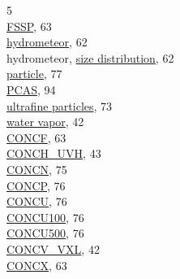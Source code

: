 \documentclass[
  english,
]{book}
\begin{document}
5\\
\hspace*{0.333em}\hspace*{0.333em}\href{./5-cloud-physics-variables.html\#concentration}{FSSP},
63\\
\hspace*{0.333em}\hspace*{0.333em}\href{./5-cloud-physics-variables.html\#concentration}{hydrometeor},
62\\
\hspace*{0.333em}\hspace*{0.333em}hydrometeor,
\href{./5-cloud-physics-variables.html\#size-distribution}{size
distribution}, 62\\
\hspace*{0.333em}\hspace*{0.333em}\href{./5-cloud-physics-variables.html\#size-distribution}{particle},
77\\
\hspace*{0.333em}\hspace*{0.333em}\href{./7-aerosol-particle-measurements.html\#concu-concp}{PCAS},
94\\
\hspace*{0.333em}\hspace*{0.333em}\href{./7-aerosol-particle-measurements.html\#condensation-nucleus-counter}{ultrafine
particles}, 73\\
\hspace*{0.333em}\hspace*{0.333em}\href{./4-the-state-of-the-atmosphere.html\#vxcel-corr}{water
vapor}, 42\\
\href{./5-cloud-physics-variables.html\#concentration}{CONCF}, 63\\
\href{./4-the-state-of-the-atmosphere.html\#uvh-n}{CONCH\_UVH}, 43\\
\href{./7-aerosol-particle-measurements.html\#concn}{CONCN}, 75\\
\href{./7-aerosol-particle-measurements.html\#concu-concp}{CONCP}, 76\\
\href{./7-aerosol-particle-measurements.html\#concu-concp}{CONCU}, 76\\
\href{./5-cloud-physics-variables.html\#concentration}{CONCU100}, 76\\
\href{./5-cloud-physics-variables.html\#concentration}{CONCU500}, 76\\
\href{./4-the-state-of-the-atmosphere.html\#vcsel-corr}{CONCV\_VXL},
42\\
\href{./5-cloud-physics-variables.html\#concentration}{CONCX}, 63\\
\end{document}
